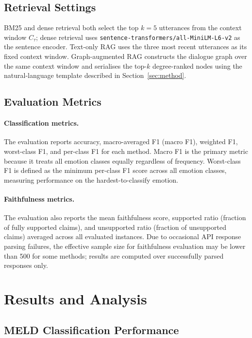 \documentclass[runningheads]{llncs}
\begin{document}
\subsection{Retrieval Settings}

BM25 and dense retrieval both select the top $k=5$ utterances from the
context window $C_\tau$; dense retrieval uses \texttt{sentence-transformers/all-MiniLM-L6-v2}
as the sentence encoder. Text-only RAG uses the three most recent utterances
as its fixed context window. Graph-augmented RAG constructs the dialogue graph
over the same context window and serialises the top-$k$ degree-ranked nodes
using the natural-language template described in Section~\ref{sec:method}.

\subsection{Evaluation Metrics}

\paragraph{Classification metrics.} The evaluation reports accuracy, macro-averaged
F1 (macro F1), weighted F1, worst-class F1, and per-class F1 for each
method. Macro F1 is the primary metric because it treats all emotion
classes equally regardless of frequency. Worst-class F1 is defined as
the minimum per-class F1 score across all emotion classes, measuring
performance on the hardest-to-classify emotion.

\paragraph{Faithfulness metrics.} The evaluation also reports the mean faithfulness
score, supported ratio (fraction of fully supported claims), and
unsupported ratio (fraction of unsupported claims) averaged across
all evaluated instances. Due to occasional API response parsing failures,
the effective sample size for faithfulness evaluation may be lower than
500 for some methods; results are computed over successfully parsed
responses only.

\section{Results and Analysis}
\label{sec:results}

\subsection{MELD Classification Performance}
\end{document}
